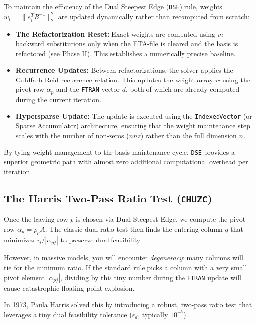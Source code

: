 \documentclass[11pt, a4paper]{article}
\begin{document}
\begin{note}
To maintain the efficiency of the Dual Steepest Edge (\texttt{DSE}) rule, weights $w_i = \|e_i^T B^{-1}\|_2^2$ are updated dynamically rather than recomputed from scratch:
\begin{itemize}[itemsep=2pt]
    \item \textbf{The Refactorization Reset:} Exact weights are computed using $m$ backward substitutions only when the ETA-file is cleared and the basis is refactored (see Phase II). This establishes a numerically precise baseline.
    \item \textbf{Recurrence Updates:} Between refactorizations, the solver applies the Goldfarb-Reid recurrence relation. This updates the weight array $w$ using the pivot row $\alpha_p$ and the \texttt{FTRAN} vector $d$, both of which are already computed during the current iteration.
    \item \textbf{Hypersparse Update:} The update is executed using the \texttt{IndexedVector} (or Sparse Accumulator) architecture, ensuring that the weight maintenance step scales with the number of non-zeros ($nnz$) rather than the full dimension $n$.
\end{itemize}
By tying weight management to the basis maintenance cycle, \texttt{DSE} provides a superior geometric path with almost zero additional computational overhead per iteration.
\end{note}

\subsection{The Harris Two-Pass Ratio Test (\texttt{CHUZC})}

Once the leaving row $p$ is chosen via Dual Steepest Edge, we compute the pivot row $\alpha_p = \rho_p A$. The classic dual ratio test then finds the entering column $q$ that minimizes $\bar{c}_j / |\alpha_{pj}|$ to preserve dual feasibility.

However, in massive models, you will encounter \emph{degeneracy}: many columns will tie for the minimum ratio. If the standard rule picks a column with a very small pivot element $|\alpha_{pj}|$, dividing by this tiny number during the \texttt{FTRAN} update will cause catastrophic floating-point explosion.

In 1973, Paula Harris solved this by introducing a robust, two-pass ratio test that leverages a tiny dual feasibility tolerance ($\epsilon_d$, typically $10^{-7}$).
\end{document}

